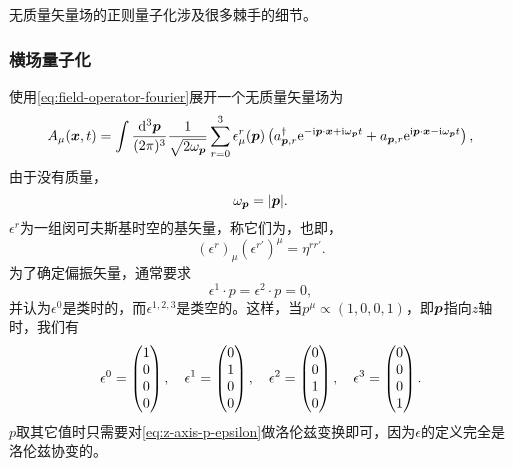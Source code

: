 无质量矢量场的正则量子化涉及很多棘手的细节。

\subsubsection{横场量子化}

使用\eqref{eq:field-operator-fourier}展开一个无质量矢量场为
\begin{equation}
    A_\mu (\vb*{x}, t) = \int \frac{\dd[3]{\vb*{p}}}{(2\pi)^3} \frac{1}{\sqrt{2 \omega_{\vb*{p}}}} \sum_{r=0}^3 \epsilon_\mu^r(\vb*{p}) \left({a}_{\vb*{p}, r}^\dagger \mathrm{e}^{ - \mathrm{i} \vb*{p} \cdot \vb*{x} + \mathrm{i} \omega_{\vb*{p}} t} + {a}_{\vb*{p}, r} \mathrm{e}^{ \mathrm{i} \vb*{p} \cdot \vb*{x} - \mathrm{i} \omega_{\vb*{p}} t} \right), 
    \label{eq:expanding-massless-vector-field}
\end{equation}
由于没有质量，
\begin{equation}
    \omega_{\vb*{p}} = \abs{\vb*{p}}.
\end{equation}
$\epsilon^r$为一组闵可夫斯基时空的基矢量，称它们为，也即，
\begin{equation}
    (\epsilon^r)_\mu (\epsilon^{r'})^\mu = \eta^{r r'}.
\end{equation}
为了确定偏振矢量，通常要求
\begin{equation}
    \epsilon^1 \cdot p = \epsilon^2 \cdot p = 0,
\end{equation}
并认为$\epsilon^0$是类时的，而$\epsilon^{1,2,3}$是类空的。这样，当$p^\mu \propto (1, 0, 0, 1)$，即$\vb*{p}$指向$z$轴时，我们有
\begin{equation}
    \epsilon^0 = \pmqty{1 \\ 0 \\ 0 \\ 0}, \quad \epsilon^1 = \pmqty{0 \\ 1 \\ 0 \\ 0}, \quad \epsilon^2 = \pmqty{0 \\ 0 \\ 1 \\ 0}, \quad \epsilon^3 = \pmqty{0 \\ 0 \\ 0 \\ 1}.
    \label{eq:z-axis-p-epsilon}
\end{equation}
$p$取其它值时只需要对\eqref{eq:z-axis-p-epsilon}做洛伦兹变换即可，因为$\epsilon$的定义完全是洛伦兹协变的。

